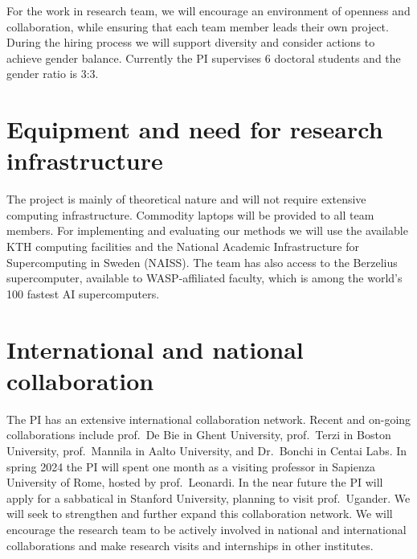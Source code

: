 \documentclass[a4paper,11pt]{article}
\begin{document}
For the work in research team, 
we will encourage an environment of openness and collaboration, 
while ensuring that each team member leads their own project.
%
During the hiring process we will support diversity and consider actions to achieve gender balance. 
Currently the PI supervises 6 doctoral students and the gender ratio is 3:3.




\section{Equipment and need for research infrastructure}


The project is mainly of theoretical nature and will not require extensive computing infrastructure. 
Commodity laptops will be provided to all team members. 
For implementing and evaluating our methods we will use the available 
KTH computing facilities
and the National Academic Infrastructure for Supercomputing in Sweden (NAISS).
The team has also access to the Berzelius supercomputer, 
available to WASP-affiliated faculty, 
which is among the world's 100 fastest AI supercomputers.

\section{International and national collaboration}


The PI has an extensive international collaboration network. 
Recent and on-going collaborations include
prof.\ De Bie in Ghent University, 
prof.\ Terzi in Boston University,
prof.\ Mannila in Aalto University, and 
Dr.\ Bonchi in Centai Labs.
In spring 2024 the PI will spent one month as a visiting professor 
in Sapienza University of Rome, hosted by prof.\ Leonardi.
In the near future the PI will apply for a sabbatical in Stanford University, 
planning to visit prof.\ Ugander. 
We will seek to strengthen and further expand this collaboration network.
We will encourage the research team to be actively involved in national and international collaborations
and make research visits and internships in other institutes.
\end{document}
